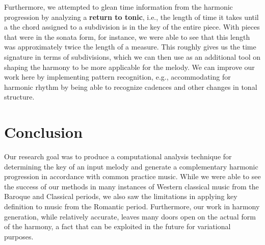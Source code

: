 \documentclass[11pt]{article}
\begin{document}
Furthermore, we attempted to glean time information from the harmonic progression by analyzing a {\bf return to tonic}, i.e., the length of time it takes until a the chord assigned to a subdivision is in the key of the entire piece. With pieces that were in the sonata form, for instance, we were able to see that this length was approximately twice the length of a measure. This roughly gives us the time signature in terms of subdivisions, which we can then use as an additional tool on shaping the harmony to be more applicable for the melody. We can improve our work here by implementing pattern recognition, e.g., accommodating for harmonic rhythm by being able to recognize cadences and other changes in tonal structure.

\section{Conclusion}
Our research goal was to produce a computational analysis technique for determining the key of an input melody and generate a complementary harmonic progression in accordance with common practice music. While we were able to see the success of our methods in many instances of Western classical music from the Baroque and Classical periods, we also saw the limitations in applying key definition to music from the Romantic period. Furthermore, our work in harmony generation, while relatively accurate, leaves many doors open on the actual form of the harmony, a fact that can be exploited in the future for variational purposes.
\end{document}
